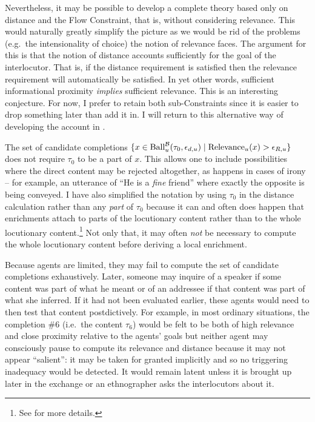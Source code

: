 Nevertheless, it may be possible to develop a complete theory based only on distance and the Flow Constraint, that is, without considering relevance. This would naturally greatly simplify the picture as we would be rid of the problems (e.g.\ the intensionality of choice) the notion of relevance faces. The argument for this is that the notion of distance accounts sufficiently for the goal of the interlocutor. That is, if the distance requirement is satisfied then the relevance requirement will automatically be satisfied. In yet other words, sufficient informational proximity \emph{implies} sufficient relevance. This is an interesting conjecture. For now, I prefer to retain both sub-Constraints since it is easier to drop something later than add it in. I will return to this alternative way of developing the account in .

The set of candidate completions $\{ x \in \hbox{Ball}^{\cal B}_u(\tau_0, \epsilon_{d,u}) \mid  \hbox{Relevance}_u(x) > \epsilon_{R,u} \}$ does not require $\tau_{0}$ to be a part of $x$. This allows one to include possibilities where the direct content may be rejected altogether, as happens in cases of irony -- for example, an utterance of ``He is a \emph{fine} friend'' where exactly the opposite is being conveyed. I have also simplified the notation by using $\tau_{0}$ in the distance calculation rather than any \emph{part} of $\tau_{0}$ because it can and often does happen that enrichments attach to parts of the locutionary content rather than to the whole locutionary content.\footnote{See \citet[156]{parikh:le} for more details.} Not only that, it may often \emph{not} be necessary to compute the whole locutionary content before deriving a local enrichment.

Because agents are limited, they may fail to compute the set of candidate completions exhaustively. Later, someone may inquire of a speaker if some content was part of what he meant or of an addressee if that content was part of what she inferred. If it had not been evaluated earlier, these agents would need to then test that content postdictively. For example, in most ordinary situations, the completion \#6 (i.e.\ the content $\tau_{6}$) would be felt to be both of high relevance and close proximity relative to the agents' goals but neither agent may consciously pause to compute its relevance and distance because it may not appear ``salient'': it may be taken for granted implicitly and so no triggering inadequacy would be detected. It would remain latent unless it is brought up later in the exchange or an ethnographer asks the interlocutors about it.

